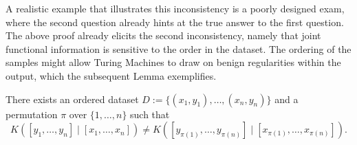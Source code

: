 A realistic example that illustrates this inconsistency is a poorly designed exam, where the second question already hints at the true answer to the first question. 
The above proof already elicits the second inconsistency, namely that joint functional information is sensitive to the order in the dataset.
The ordering of the samples might allow Turing Machines to draw on benign regularities within the output, which the subsequent Lemma exemplifies.
\begin{lemma}
	There exists an ordered dataset $D:=\{(x_1,y_1),\dots,(x_n,y_n)\}$ and a permutation $\pi$ over $\{1,\dots,n\}$ such that 
	\begin{equation}
		K([y_1,\dots,y_n]\mid [x_1,\dots,x_n]) \neq K([y_{\pi(1)},\dots,y_{\pi(n)}] \mid [x_{\pi(1)},\dots,x_{\pi(n)}]).
	\end{equation}
\end{lemma}
